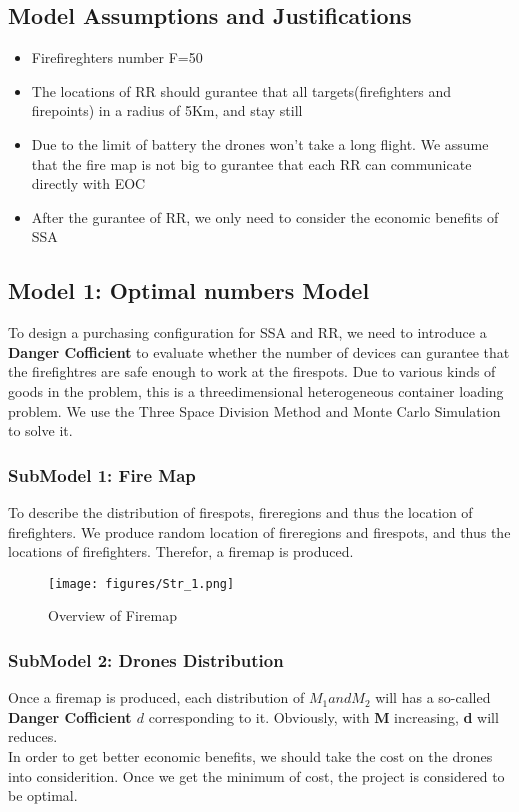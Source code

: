 \documentclass{mcmthesis}
\begin{document}
\subsection{Model Assumptions and Justifications}
\begin{itemize}
  \item Firefireghters number F=50
  \item The locations of RR should gurantee that all targets(firefighters and firepoints)
  in a radius of 5Km, and stay still
  \item Due to the limit of battery the drones won't take a long flight. We assume
  that the fire map is not big to gurantee that each RR can communicate directly with EOC
  \item After the gurantee of RR, we only need to consider the economic benefits of SSA
\end{itemize}
\subsection{Model 1: Optimal numbers Model}
To design a purchasing configuration for SSA and RR, we need to introduce a \textbf{Danger Cofficient}
to evaluate whether the number of devices can gurantee that the firefightres are safe enough to work at
the firespots. Due to various kinds of goods in the problem, this is a threedimensional
heterogeneous container loading problem. We use the Three Space Division
Method and Monte Carlo Simulation to solve it.

\subsubsection{{SubModel 1: Fire Map}}
To describe the distribution of firespots, fireregions and thus the location
of firefighters. We produce random location of fireregions and firespots, and thus
the locations of firefighters. Therefor, a firemap is produced. 
\begin{figure}[htbp]
  \centering
  \texttt{[image: figures/Str\_1.png]}
  \caption{Overview of Firemap}
  \label{Overview of Firemap}
\end{figure}




\subsubsection{SubModel 2: Drones Distribution}
Once a firemap is produced, each distribution of $M_1 and M_2$ will has a so-called
\textbf{Danger Cofficient $d$} corresponding to it. Obviously, with \textbf{M} increasing, 
\textbf{d} will reduces.\\
In order to get better economic benefits, we should take the cost on the drones
into considerition. Once we get the minimum of cost, the project is considered to be optimal. 
\end{document}
